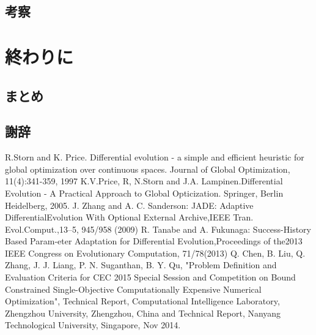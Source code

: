 \documentclass[a4paper,11pt,oneside,openany]{jsbook}
\begin{document}
\section{考察}

\chapter{終わりに}
\section{まとめ}
\section{謝辞}


\begin{thebibliography}{10}
 R.Storn and K. Price. Differential evolution - a simple and efficient heuristic for global optimization over continuous spaces. Journal of Global Optimization, 11(4):341-359, 1997 
  K.V.Price, R, N.Storn and J.A. Lampinen.Differential Evolution - A Practical Approach to Global Opticization. Springer, Berlin Heidelberg, 2005.
  J. Zhang and A. C. Sanderson: JADE: Adaptive DifferentialEvolution With Optional External Archive,IEEE Tran. Evol.Comput.,13–5, 945/958 (2009)
  R. Tanabe and A. Fukunaga: Success-History Based Param-eter Adaptation for Differential Evolution,Proceedings of the2013 IEEE Congress on Evolutionary Computation, 71/78(2013)
  Q. Chen, B. Liu,  Q. Zhang, J. J. Liang, P. N. Suganthan, B. Y. Qu, "Problem Definition and Evaluation Criteria for CEC 2015 Special Session and Competition on Bound Constrained Single-Objective Computationally Expensive Numerical Optimization", Technical Report, Computational Intelligence Laboratory, Zhengzhou University, Zhengzhou, China  and  Technical Report, Nanyang Technological University, Singapore, Nov 2014.

\end{thebibliography}
\end{document}
